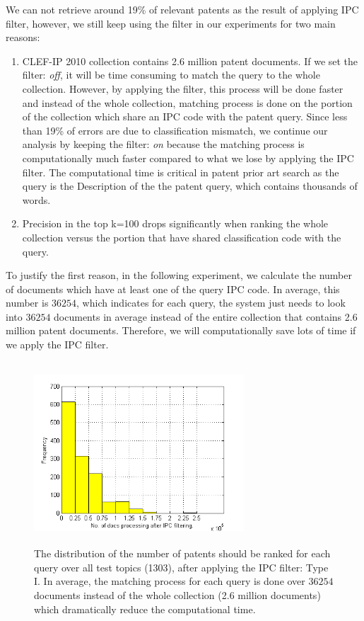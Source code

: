 We can not retrieve around 19\% of relevant patents as the result of applying IPC filter, however, we still keep using the filter in our experiments for two main reasons: 
\begin{enumerate}
\item CLEF-IP 2010 collection contains 2.6 million patent documents. If we set the filter: \textit{off}, it will be time consuming to match the query to the whole collection. However, by applying the filter, this process will be done faster and instead of the whole collection, matching process is done on the portion of the collection which share an IPC code with the patent query. Since less than 19\% of errors are due to classification mismatch, we continue our analysis by keeping the filter: \textit{on} because the matching process is computationally much faster compared to what we lose by applying the IPC filter. The computational time is critical in patent prior art search as the query is the Description of the the patent query, which contains thousands of words.   
\item Precision in the top k=100 drops significantly when ranking the whole collection versus the portion that have shared classification code with the query.  
\end{enumerate}

To justify the first reason, in the following experiment, we calculate the number of documents which have at least one of the query IPC code. In average, this number is $ 36254 $, which indicates for each query, the system just needs to look into $ 36254 $ documents in average instead of the entire collection that contains 2.6 million patent documents. Therefore, we will computationally save lots of time if we apply the IPC filter.  
\begin{figure}[t!]
   \centering
   \includegraphics[width=0.70\textwidth,height=68mm]{figs/ipcfilter-histo.png}
   \caption{The distribution of the number of patents should be ranked for each query over all test topics (1303), after applying the IPC filter: Type I.
In average, the matching process for each query is done over $ 36254 $ documents instead of the whole collection (2.6 million documents) which dramatically reduce the computational time.}   
   \label{fig:ipcfilter-histo} 
\end{figure}

